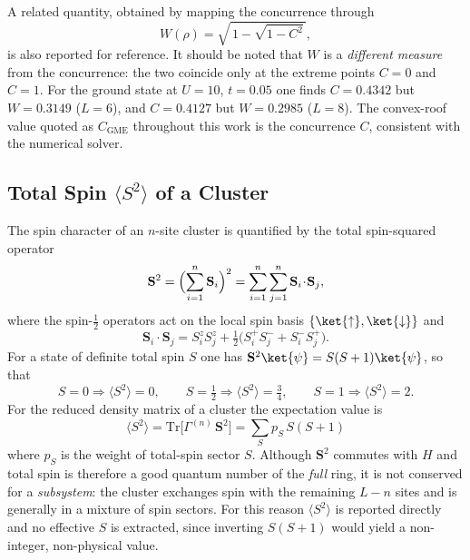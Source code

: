 A related quantity, obtained by mapping the concurrence through
%
\begin{equation}
    W(\rho) = \sqrt{\,1-\sqrt{1-C^{2}}\,},
\end{equation}
%
is also reported for reference. It should be noted that $W$ is a
\emph{different measure} from the concurrence: the two coincide only at the
extreme points $C=0$ and $C=1$. For the ground state at $U=10$, $t=0.05$ one
finds $C=0.4342$ but $W=0.3149$ ($L=6$), and $C=0.4127$ but $W=0.2985$
($L=8$). The convex-roof value quoted as $C_{\mathrm{GME}}$ throughout this
work is the concurrence $C$, consistent with the numerical solver.

\subsection{Total Spin $\langle S^{2}\rangle$ of a Cluster}
The spin character of an $n$-site cluster is quantified by the total
spin-squared operator
%
\begin{equation}
    \mathbf{S}^{2} = \Bigl(\sum_{i=1}^{n}\mathbf{S}_i\Bigr)^{2}
                   = \sum_{i=1}^{n}\sum_{j=1}^{n} \mathbf{S}_i\!\cdot\!\mathbf{S}_j ,
\end{equation}
%
where the spin-$\tfrac12$ operators act on the local spin basis
$\{\ket{\uparrow},\ket{\downarrow}\}$ and
%
\begin{equation}
    \mathbf{S}_i\!\cdot\!\mathbf{S}_j
      = S_i^{z}S_j^{z}
      + \tfrac{1}{2}\bigl(S_i^{+}S_j^{-} + S_i^{-}S_j^{+}\bigr).
\end{equation}
%
For a state of definite total spin $S$ one has
$\mathbf{S}^{2}\ket{\psi}=S(S+1)\ket{\psi}$, so that
%
\begin{equation}
    S=0 \Rightarrow \langle S^{2}\rangle = 0, \qquad
    S=\tfrac12 \Rightarrow \langle S^{2}\rangle = \tfrac34, \qquad
    S=1 \Rightarrow \langle S^{2}\rangle = 2 .
\end{equation}
%
For the reduced density matrix of a cluster the expectation value is
%
\begin{equation}
    \boxed{\;\langle S^{2}\rangle
        = \mathrm{Tr}\bigl[\Gamma^{(n)}\,\mathbf{S}^{2}\bigr]
        = \sum_{S} p_S\, S(S+1)\;}
\end{equation}
%
where $p_S$ is the weight of total-spin sector $S$. Although $\mathbf{S}^{2}$
commutes with $H$ and total spin is therefore a good quantum number of the
\emph{full} ring, it is not conserved for a \emph{subsystem}: the cluster
exchanges spin with the remaining $L-n$ sites and is generally in a mixture of
spin sectors. For this reason $\langle S^{2}\rangle$ is reported directly and
no effective $S$ is extracted, since inverting $S(S+1)$ would yield a
non-integer, non-physical value.

